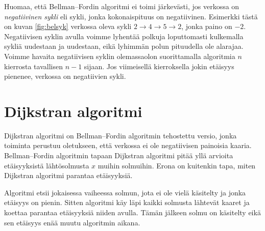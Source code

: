 Huomaa, että Bellman–Fordin algoritmi ei toimi järkevästi,
jos verkossa on \emph{negatiivinen sykli}
eli sykli, jonka kokonaispituus on negatiivinen.
Esimerkki tästä on kuvan \ref{fig:belsyk} verkossa oleva sykli
$2 \rightarrow 4 \rightarrow 5 \rightarrow 2$, jonka paino on $-2$.
Negatiivisen syklin avulla voimme lyhentää polkuja loputtomasti kulkemalla
sykliä uudestaan ja uudestaan, eikä lyhimmän polun pituudella ole alarajaa.
Voimme havaita negatiivisen syklin olemassaolon suorittamalla
algoritmia $n$ kierrosta tavallisen $n-1$ sijaan.
Jos viimeisellä kierroksella jokin etäisyys pienenee,
verkossa on negatiivien sykli.

\section{Dijkstran algoritmi}

Dijkstran algoritmi on Bellman–Fordin algoritmin tehostettu versio,
jonka toiminta perustuu oletukseen, että verkossa ei ole
negatiivisen painoisia kaaria.
Bellman–Fordin algoritmin tapaan Dijkstran algoritmi pitää
yllä arvioita etäisyyksistä lähtösolmusta $x$ muihin solmuihin.
Erona on kuitenkin tapa, miten Dijkstran algoritmi parantaa etäisyyksiä.

Algoritmi etsii jokaisessa vaiheessa solmun, jota ei ole vielä
käsitelty ja jonka etäisyys on pienin.
Sitten algoritmi käy läpi kaikki solmusta lähtevät kaaret ja
koettaa parantaa etäisyyksiä niiden avulla.
Tämän jälkeen solmu on käsitelty eikä sen etäisyys enää
muutu algoritmin aikana.

